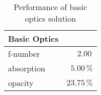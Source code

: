 \begin{table}[H]
\centering
\caption{Performance of basic optics solution}
\label{tab:basic_optics}
\begin{tabular}{|l|r|}\hline
    \textbf{Basic Optics} & \\
    \hline 
    f-number & $2.00\, $ \\
    absorption & $5.00\,\%$ \\
    opacity & $23.75\, \%$ \\
    \hline 
\end{tabular}
\end{table}
